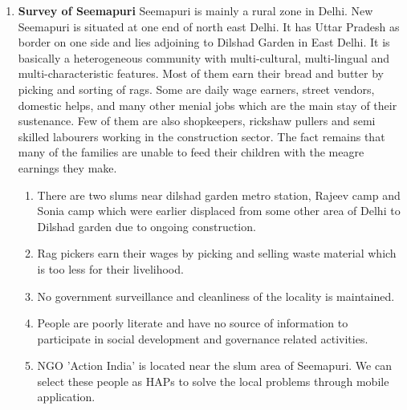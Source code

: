 \begin{enumerate}
\begin{enumerate}
\end{enumerate}


\item \textbf {Survey of Seemapuri}
Seemapuri is mainly a rural zone in Delhi. New Seemapuri is situated at one end of north east Delhi. It has Uttar Pradesh as border on one side and lies adjoining to Dilshad Garden in East Delhi. It is basically a heterogeneous community with multi-cultural, multi-lingual and multi-characteristic features. Most of them earn their bread and butter by picking and sorting of rags. Some are daily wage earners, street vendors, domestic helps, and many other menial jobs which are the main stay of their sustenance. Few of them are also shopkeepers, rickshaw pullers and semi skilled labourers working in the construction sector. The fact remains that many of the families are unable to feed their children with the meagre earnings they make.
\begin{enumerate}
\item There are two slums near dilshad garden metro station, Rajeev camp and Sonia camp which were earlier displaced from some other area of Delhi to Dilshad garden due to ongoing construction.
\item Rag pickers earn their wages by picking and selling waste material which is too less for their livelihood.
\item No government surveillance and cleanliness of the locality is maintained.
\item People are poorly literate and have no source of information to participate in social development and governance related activities.

\item NGO 'Action India' is located near the slum area of Seemapuri. We can select these people as HAPs to solve the local problems through mobile application.
\end{enumerate}

\end{enumerate}


